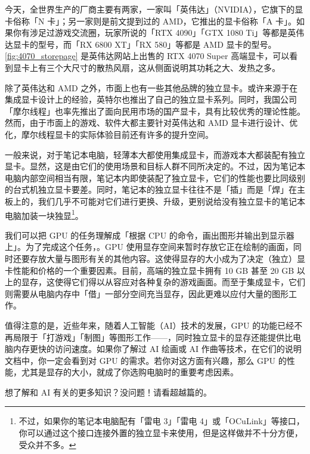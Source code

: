 今天，全世界生产的厂商主要有两家，一家叫「英伟达」（NVIDIA），它旗下的显卡俗称「N 卡」；另一家则是前文提到过的 AMD，它推出的显卡俗称「A 卡」。如果你有涉足过游戏交流圈，玩家所说的「RTX 4090」「GTX 1080 Ti」等都是英伟达显卡的型号，而「RX 6800 XT」「RX 580」等都是 AMD 显卡的型号。\autoref{fig:4070_storepage} 是英伟达网站上出售的 RTX 4070 Super 高端显卡，可以看到显卡上有三个大尺寸的散热风扇，这从侧面说明其功耗之大、发热之多。

\begin{note}
  除了英伟达和 AMD 之外，市面上也有一些其他品牌的独立显卡。或许来源于在集成显卡设计上的经验，英特尔也推出了自己的独立显卡系列。同时，我国公司「摩尔线程」也率先推出了面向民用市场的国产显卡，具有比较优秀的理论性能。然而，由于市面上的游戏、软件大都主要针对英伟达和 AMD 显卡进行设计、优化，摩尔线程显卡的实际体验目前还有许多的提升空间。
\end{note}

一般来说，对于笔记本电脑，轻薄本大都使用集成显卡，而游戏本大都装配有独立显卡。显然，这是由它们的使用场景和目标人群不同所决定的。不过，因为笔记本电脑内部空间相当有限，笔记本内即使装配了独立显卡，它们的性能也要比同级别的台式机独立显卡要差。同时，笔记本的独立显卡往往不是「插」而是「焊」在主板上的，我们几乎不可能对它们进行更换、升级，更别说给没有独立显卡的笔记本电脑加装一块独显\footnote{不过，如果你的笔记本电脑配有「雷电 3」「雷电 4」或「OCuLink」等接口，你可以通过这个接口连接外置的独立显卡来使用，但是这样做并不十分方便，受众并不多。}。

我们可以把 GPU 的任务理解成「根据 CPU 的命令，画出图形并输出到显示器上」。为了完成这个任务，。GPU 使用显存空间来暂时存放它正在绘制的画面，同时还要存放大量与图形有关的其他内容。这使得显存的大小成为了决定（独立）显卡性能和价格的一个重要因素。目前，高端的独立显卡拥有 10 GB 甚至 20 GB 以上的显存，这使得它们得以从容应对各种复杂的游戏画面。而至于集成显卡，它们则需要从电脑内存中「借」一部分空间充当显存，因此更难以应付大量的图形工作。

值得注意的是，近些年来，随着人工智能（AI）技术的发展，GPU 的功能已经不再局限于「打游戏」「制图」等图形工作——，同时独立显卡的显存还能提供比电脑内存更快的访问速度。如果你了解过 AI 绘画或 AI 作曲等技术，在它们的说明文档中，你一定会看到对 GPU 的需求。若你对这方面有兴趣，那么 GPU 的性能，尤其是显存的大小，就成了你选购电脑时的重要考虑因素。

\begin{note}
  想了解和 AI 有关的更多知识？没问题！请看超越篇的。
\end{note}

